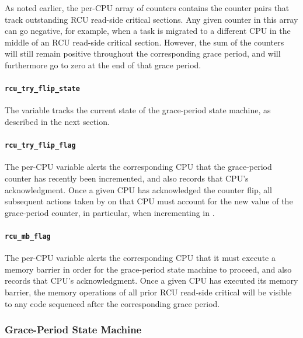 As noted earlier, the 
per-CPU array of counters contains the
counter pairs that track outstanding RCU read-side critical sections.
Any given counter in this array can go negative, for example, when
a task is migrated to a different CPU in the middle of an RCU
read-side critical section.
However, the sum of the counters will
still remain positive throughout the corresponding grace period, and will
furthermore go to zero at the end of that grace period.

\paragraph{{\tt rcu\_try\_flip\_state}}
\label{app:rcuimpl:rcu_try_flip_state}

The  variable tracks the current state of
the grace-period state machine, as described in the next section.

\paragraph{{\tt rcu\_try\_flip\_flag}}
\label{app:rcuimpl:rcu_try_flip_flag}

The  per-CPU variable alerts the corresponding
CPU that the grace-period counter has recently been incremented, and
also records that CPU's acknowledgment.
Once a given CPU has acknowledged the counter flip, all subsequent actions
taken by  on that CPU must account for the
new value of the grace-period counter, in particular, when incrementing
 in .

\paragraph{{\tt rcu\_mb\_flag}}
\label{app:rcuimpl:rcu_mb_flag}

The  per-CPU variable alerts the corresponding
CPU that it must execute a memory barrier in order for the grace-period
state machine to proceed, and also records that CPU's acknowledgment.
Once a given CPU has executed its memory barrier, the memory operations
of all prior RCU read-side critical will be visible to any code sequenced
after the corresponding grace period.


\subsubsection{Grace-Period State Machine}
\label{app:rcuimpl:Grace-Period State Machine}

